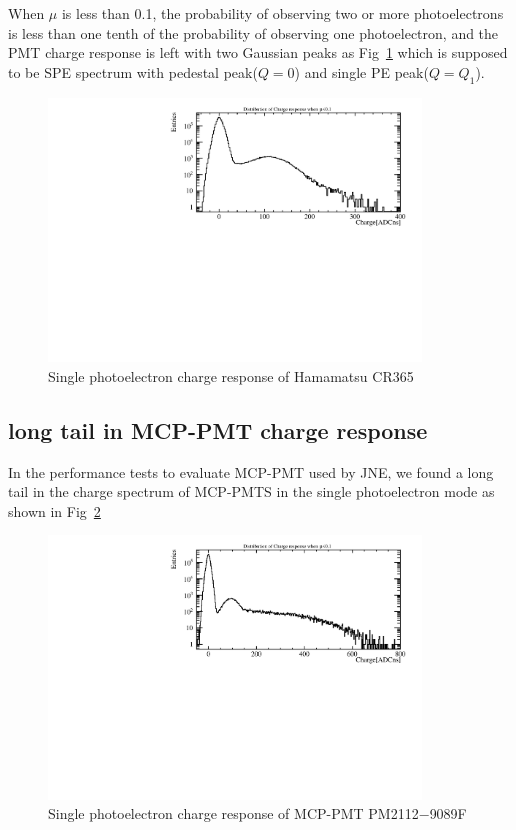 \documentclass{article}
\begin{document}
When $\mu$ is less than 0.1, the probability of observing two or more photoelectrons is less than one tenth of the probability
of observing one photoelectron, and the PMT charge response is left with two Gaussian peaks as Fig~\ref{fig:spe_sreal}
which is supposed to be SPE spectrum with pedestal peak($Q=0$) and single PE peak($Q=Q_1$)\cite{Xia_2015}.
\begin{figure}[ht]
    \centering
    \includegraphics[height=7cm]{pic/siglepe.pdf}
    \caption{Single photoelectron charge response of Hamamatsu CR365}
    \label{fig:spe_sreal}
\end{figure}
\subsection{long tail in MCP-PMT charge response}\label{subsec:tail}
In the performance tests to evaluate MCP-PMT used by JNE, we found a long tail in the charge spectrum of MCP-PMTS in the single photoelectron mode as shown in Fig~\ref{fig:tail}
\begin{figure}[ht]
    \centering
    \includegraphics[height=7cm]{pic/longtail.pdf}
    \caption{Single photoelectron charge response of MCP-PMT PM2112$-$9089F}\label{fig:tail}
\end{figure}
\end{document}
